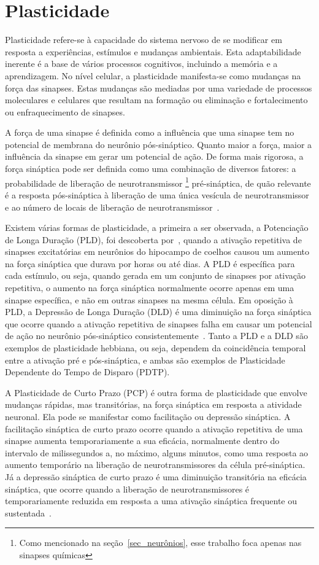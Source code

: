 \section{Plasticidade}\label{section_plasticidade}

Plasticidade refere-se à capacidade do sistema nervoso de se modificar em resposta a experiências, estímulos e mudanças
ambientais. Esta adaptabilidade inerente é a base de vários processos cognitivos, incluindo a memória e a aprendizagem. No nível
celular, a plasticidade manifesta-se como mudanças na força das sinapses. Estas mudanças são mediadas por uma variedade de
processos moleculares e celulares que resultam na formação ou eliminação e fortalecimento ou enfraquecimento de sinapses.

A força de uma sinapse é definida como a influência que uma sinapse tem no potencial de membrana do neurônio pós-sináptico. Quanto
maior a força, maior a influência da sinapse em gerar um potencial de ação. De forma mais rigorosa, a força sináptica pode ser
definida como uma combinação de diversos fatores: a probabilidade de liberação de neurotransmissor
\footnote{Como mencionado na seção~\ref{sec_neurônios}, esse trabalho foca apenas nas sinapses químicas}
pré-sináptica, de quão relevante é a resposta pós-sináptica à liberação de uma única vesícula de neurotransmissor e ao número de
locais de liberação de neurotransmissor~\cite{fattSpontaneous1952}. 

Existem várias formas de plasticidade, a primeira a ser observada, a Potenciação de Longa Duração (PLD), foi descoberta
por~\cite{blissLonglasting1973}, quando a ativação repetitiva de sinapses excitatórias em neurônios do hipocampo de coelhos causou
um aumento na força sináptica que durava por horas ou até dias. A PLD é específica para cada estímulo, ou seja, quando gerada em
um conjunto de sinapses por ativação repetitiva, o aumento na força sináptica normalmente ocorre apenas em uma sinapse específica,
e não em outras sinapses na mesma célula. Em oposição à PLD, a Depressão de Longa Duração (DLD) é uma diminuição na força
sináptica que ocorre quando a ativação repetitiva de sinapses falha em causar um potencial de ação no neurônio pós-sináptico
consistentemente~\cite{dudekHomosynaptic1992}. Tanto a PLD e a DLD são exemplos de plasticidade hebbiana, ou seja, dependem da
coincidência temporal entre a ativação pré e pós-sináptica, e ambas são exemplos de Plasticidade Dependente do Tempo de Disparo
(PDTP).

A Plasticidade de Curto Prazo (PCP) é outra forma de plasticidade que envolve mudanças rápidas, mas transitórias, na força
sináptica em resposta a atividade neuronal. Ela pode se manifestar como facilitação ou depressão sináptica. A facilitação
sináptica de curto prazo ocorre quando a ativação repetitiva de uma sinapse aumenta temporariamente a sua eficácia, normalmente
dentro do intervalo de milissegundos a, no máximo, alguns minutos, como uma resposta ao aumento temporário na liberação de
neurotransmissores da célula pré-sináptica. Já a depressão sináptica de curto prazo é uma diminuição transitória na eficácia
sináptica, que ocorre quando a liberação de neurotransmissores é temporariamente reduzida em resposta a uma ativação sináptica
frequente ou sustentada~\cite{zuckerShortTerm2002}.

